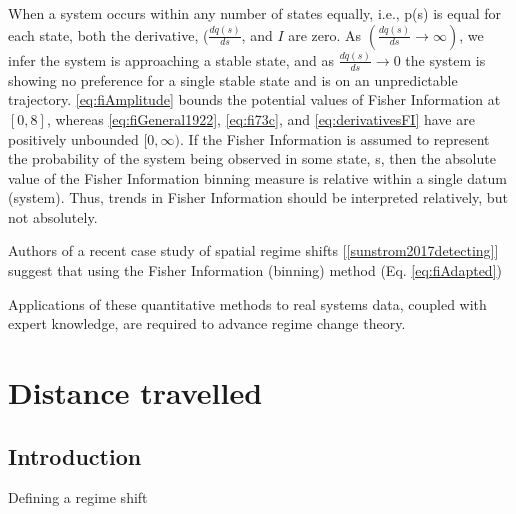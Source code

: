 \documentclass[12pt,twoside,openany]{reedthesis}
\begin{document}
When a system occurs within any number of states equally, i.e., p(s) is equal for each state, both the derivative, (\(\frac{dq(s)}{ds}\), and \(I\) are zero. As \((\frac{dq(s)}{ds} \rightarrow \infty)\), we infer the system is approaching a stable state, and as \(\frac{dq(s)}{ds} \rightarrow 0\) the system is showing no preference for a single stable state and is on an unpredictable trajectory. \eqref{eq:fiAmplitude} bounds the potential values of Fisher Information at \([0, 8]\), whereas \eqref{eq:fiGeneral1922}, \eqref{eq:fi73c}, and \eqref{eq:derivativesFI} have are positively unbounded \([0, \infty)\). If the Fisher Information is assumed to represent the probability of the system being observed in some state, s, then the absolute value of the Fisher Information binning measure is relative within a single datum (system). Thus, trends in Fisher Information should be interpreted relatively, but not absolutely.

Authors of a recent case study of spatial regime shifts {[}\ref{sunstrom2017detecting}{]} suggest that using the Fisher Information (binning) method (Eq. \eqref{eq:fiAdapted})

Applications of these quantitative methods to real systems data, coupled with expert knowledge, are required to advance regime change theory.

\hypertarget{distance-chapter}{%
\chapter{Distance travelled}\label{distance-chapter}}

\hypertarget{introduction-3}{%
\section{Introduction}\label{introduction-3}}

Defining a regime shift
\end{document}
